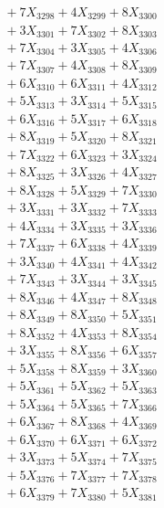 \documentclass[a4paper,10pt]{article}
\begin{document}
{\begin{align}
&\;  + 7 X_{3298} + 4 X_{3299} + 8 X_{3300} \\[0.3ex]
&\;  + 3 X_{3301} + 7 X_{3302} + 8 X_{3303} \\[0.3ex]
&\;  + 7 X_{3304} + 3 X_{3305} + 4 X_{3306} \\[0.3ex]
&\;  + 7 X_{3307} + 4 X_{3308} + 8 X_{3309} \\[0.5ex]\allowbreak
&\;  + 6 X_{3310} + 6 X_{3311} + 4 X_{3312} \\[0.3ex]
&\;  + 5 X_{3313} + 3 X_{3314} + 5 X_{3315} \\[0.3ex]
&\;  + 6 X_{3316} + 5 X_{3317} + 6 X_{3318} \\[0.3ex]
&\;  + 8 X_{3319} + 5 X_{3320} + 8 X_{3321} \\[0.3ex]
&\;  + 7 X_{3322} + 6 X_{3323} + 3 X_{3324} \\[0.3ex]
&\;  + 8 X_{3325} + 3 X_{3326} + 4 X_{3327} \\[0.3ex]
&\;  + 8 X_{3328} + 5 X_{3329} + 7 X_{3330} \\[0.3ex]
&\;  + 3 X_{3331} + 3 X_{3332} + 7 X_{3333} \\[0.3ex]
&\;  + 4 X_{3334} + 3 X_{3335} + 3 X_{3336} \\[0.3ex]
&\;  + 7 X_{3337} + 6 X_{3338} + 4 X_{3339} \\[0.5ex]\allowbreak
&\;  + 3 X_{3340} + 4 X_{3341} + 4 X_{3342} \\[0.3ex]
&\;  + 7 X_{3343} + 3 X_{3344} + 3 X_{3345} \\[0.3ex]
&\;  + 8 X_{3346} + 4 X_{3347} + 8 X_{3348} \\[0.3ex]
&\;  + 8 X_{3349} + 8 X_{3350} + 5 X_{3351} \\[0.3ex]
&\;  + 8 X_{3352} + 4 X_{3353} + 8 X_{3354} \\[0.3ex]
&\;  + 3 X_{3355} + 8 X_{3356} + 6 X_{3357} \\[0.3ex]
&\;  + 5 X_{3358} + 8 X_{3359} + 3 X_{3360} \\[0.3ex]
&\;  + 5 X_{3361} + 5 X_{3362} + 5 X_{3363} \\[0.3ex]
&\;  + 5 X_{3364} + 5 X_{3365} + 7 X_{3366} \\[0.3ex]
&\;  + 6 X_{3367} + 8 X_{3368} + 4 X_{3369} \\[0.5ex]\allowbreak
&\;  + 6 X_{3370} + 6 X_{3371} + 6 X_{3372} \\[0.3ex]
&\;  + 3 X_{3373} + 5 X_{3374} + 7 X_{3375} \\[0.3ex]
&\;  + 5 X_{3376} + 7 X_{3377} + 7 X_{3378} \\[0.3ex]
&\;  + 6 X_{3379} + 7 X_{3380} + 5 X_{3381} \\[0.3ex]

\end{align}}
\end{document}
